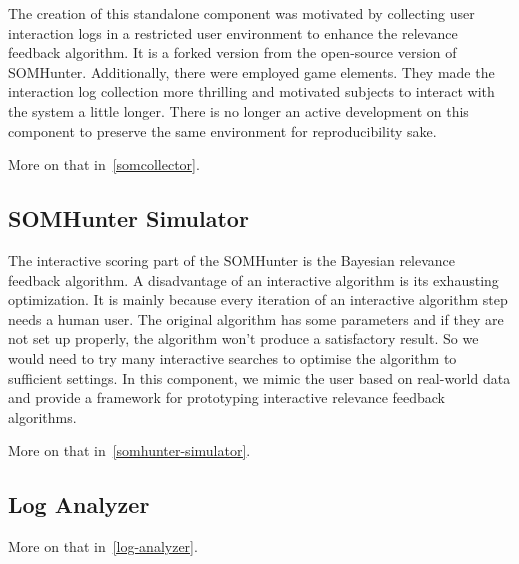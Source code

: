 The creation of this standalone component was motivated by collecting user interaction logs in a restricted user environment to enhance the relevance feedback algorithm. It is a forked version from the open-source version of SOMHunter. Additionally, there were employed game elements. They made the interaction log collection more thrilling and motivated subjects to interact with the system a little longer. There is no longer an active development on this component to preserve the same environment for reproducibility sake.

More on that in~\cref{somcollector}.

\subsection{SOMHunter Simulator}

The interactive scoring part of the SOMHunter is the Bayesian relevance feedback algorithm. A disadvantage of an interactive algorithm is its exhausting optimization. It is mainly because every iteration of an interactive algorithm step needs a human user. The original algorithm has some parameters and if they are not set up properly, the algorithm won't produce a satisfactory result. So we would need to try many interactive searches to optimise the algorithm to sufficient settings. In this component, we mimic the user based on real-world data and provide a framework for prototyping interactive relevance feedback algorithms.

More on that in~\cref{somhunter-simulator}.

\subsection{Log Analyzer}

More on that in~\cref{log-analyzer}.


